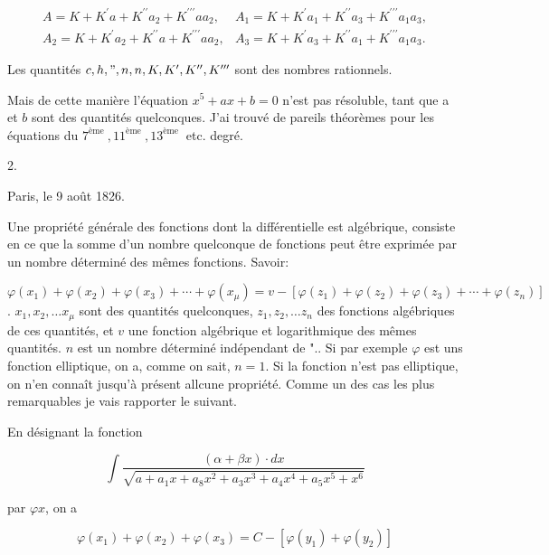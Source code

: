 \documentclass{article}
\begin{document}
\[
\begin{array}{ll}
A=K+K^{\prime} a+K^{\prime \prime} a_{2}+K^{\prime \prime \prime} a a_{2}, & A_{1}=K+K^{\prime} a_{1}+K^{\prime \prime} a_{3}+K^{\prime \prime \prime} a_{1} a_{3}, \\
A_{2}=K+K^{\prime} a_{2}+K^{\prime \prime} a+K^{\prime \prime \prime} a a_{2}, & A_{3}=K+K^{\prime} a_{3}+K^{\prime \prime} a_{1}+K^{\prime \prime \prime} a_{1} a_{3} .
\end{array}
\]

Les quantités \(c, h, ", n, n, K, K^{\prime}, K^{\prime \prime}, K^{\prime \prime \prime}\) sont des nombres rationnels.

Mais de cette manière l'équation \(x^{5}+a x+b=0\) n'est pas résoluble, tant que a et \(b\) sont des quantités quelconques. J'ai trouvé de pareils théorèmes pour les équations du \(7^{\text {ème }}, 11^{\text {ème }}, 13^{\text {ème }}\) etc. degré.

2.

Paris, le 9 août 1826.

Une propriété générale des fonctions dont la différentielle est algébrique, consiste en ce que la somme d'un nombre quelconque de fonctions peut être exprimée par un nombre déterminé des mêmes fonctions. Savoir:

\(\varphi\left(x_{1}\right)+\varphi\left(x_{2}\right)+\varphi\left(x_{3}\right)+\cdots+\varphi\left(x_{\mu}\right)=v-\left[\varphi\left(z_{1}\right)+\varphi\left(z_{2}\right)+\varphi\left(z_{3}\right)+\cdots+\varphi\left(z_{n}\right)\right]\). \(x_{1}, x_{2}, \ldots x_{\mu}\) sont des quantités quelconques, \(z_{1}, z_{2}, \ldots z_{n}\) des fonctions algébriques de ces quantités, et \(v\) une fonction algébrique et logarithmique des mêmes quantités. \(n\) est un nombre déterminé indépendant de ".. Si par exemple \(\varphi\) est uns fonction elliptique, on a, comme on sait, \(n=1\). Si la fonction n'est pas elliptique, on n'en connaît jusqu'à présent allcune propriété. Comme un des cas les plus remarquables je vais rapporter le suivant.

En désignant la fonction

\[
\int \frac{(\alpha+\beta x) \cdot d x}{\sqrt{a+a_{1} x+a_{8} x^{2}+a_{3} x^{3}+a_{4} x^{4}+a_{5} x^{5}+x^{6}}}
\]

par \(\varphi x\), on a

\[
\varphi\left(x_{1}\right)+\varphi\left(x_{2}\right)+\varphi\left(x_{3}\right)=C-\left[\varphi\left(y_{1}\right)+\varphi\left(y_{2}\right)\right]
\]
\end{document}
